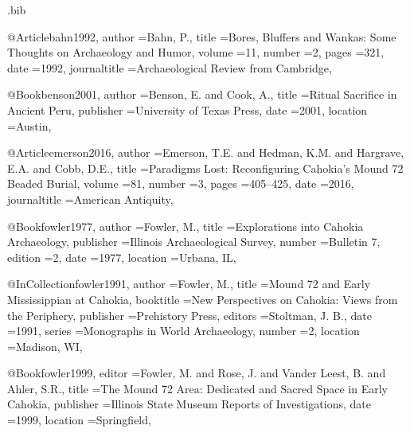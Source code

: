 \def\IJSRAidentifier{\currfilebase} %
\def\shorttitle{Gendering the traces}
\def\maintitle{Gendering the traces}
\def\cmail{}
\def\keywords{}
\def\abstract{}
\def\authorone{Amanda Padoan}
\def\bioone{}
\def\affilone{}

\begin{filecontents}{\IJSRAidentifier.bib}

@Article{bahn1992,
	author       ={Bahn, P.},
	title        ={Bores, Bluffers and Wankas: Some Thoughts on Archaeology and Humor},
	volume       ={11},
	number       ={2},
	pages        ={321},
	date         ={1992},
	journaltitle ={Archaeological Review from Cambridge},
}

@Book{benson2001,
	author       ={Benson, E. and Cook, A.},
	title        ={Ritual Sacrifice in Ancient Peru},
	publisher    ={University of Texas Press},
	date         ={2001},
	location     ={Austin},
}

@Article{emerson2016,
	author       ={Emerson, T.E. and Hedman, K.M. and Hargrave, E.A. and Cobb, D.E.},
	title        ={Paradigms Lost: Reconfiguring Cahokia's Mound 72 Beaded Burial},
	volume       ={81},
	number       ={3},
	pages        ={405--425},
	date         ={2016},
	journaltitle ={American Antiquity},
}

@Book{fowler1977,
	author       ={Fowler, M.},
	title        ={Explorations into Cahokia Archaeology},
	publisher    ={Illinois Archaeological Survey},
    number       ={Bulletin 7},
    edition      ={2},
	date         ={1977},
	location     ={Urbana, IL},
}

@InCollection{fowler1991,
	author       ={Fowler, M.},
	title        ={Mound 72 and Early Mississippian at Cahokia},
	booktitle    ={New Perspectives on Cahokia: Views from the Periphery},
	publisher    ={Prehistory Press},
	editors      ={Stoltman, J. B.},
	date         ={1991},
	series       ={Monographs in World Archaeology}, 
	number       ={2},
	location     ={Madison, WI},
}​

@Book{fowler1999,
	editor       ={Fowler, M. and Rose, J. and {Vander} Leest, B. and Ahler, S.R.},
	title        ={The Mound 72 Area: Dedicated and Sacred Space in Early Cahokia},
	publisher    ={Illinois State Museum Reports of Investigations},
	date         ={1999},
	location     ={Springfield},
}


\end{filecontents}
